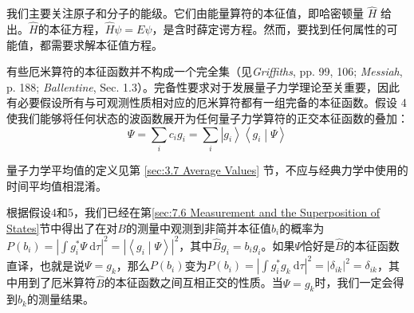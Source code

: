    \begin{center}
    \end{center}

    我们主要关注原子和分子的能级。它们由能量算符的本征值，即哈密顿量 $\hat{H}$ 给出。$\hat{H}$的本征方程，$\hat{H}\psi = E\psi$，是含时薛定谔方程。然而，要找到任何属性的可能值，都需要求解本征值方程。

    \begin{center}
    \end{center}

    有些厄米算符的本征函数并不构成一个完全集（见\textit{Griffiths}, pp. 99, 106; \textit{Messiah}, p. 188; \textit{Ballentine}, Sec. 1.3）。完备性要求对于发展量子力学理论至关重要，因此有必要假设所有与可观测性质相对应的厄米算符都有一组完备的本征函数。假设 4 使我们能够将任何状态的波函数展开为任何量子力学算符的正交本征函数的叠加：
    \begin{equation}
        \Psi = \sum_{i}c_ig_i = \sum_{i}\left| g_i \right\rangle \left\langle g_i \middle| \Psi \right\rangle
        \label{eq:7.95}
    \end{equation}

    \begin{center}
    \end{center}

    量子力学平均值的定义见第 \ref{sec:3.7 Average Values} 节，不应与经典力学中使用的时间平均值相混淆。

    根据假设4和5，我们已经在第\ref{sec:7.6 Measurement and the Superposition of States}节中得出了在对$B$的测量中观测到非简并本征值$b_i$的概率为$P\left(b_i\right) = \left|\int g_i^{\ast}\Psi \: \mathrm{d}\tau\right|^2 = \left|\left\langle g_i \middle| \Psi \right\rangle\right|^2$，其中$\hat{B}g_i = b_ig_i$。如果$\Psi$恰好是$\hat{B}$的本征函数直译，也就是说$\Psi = g_k$，那么$P\left(b_i\right)$变为$P\left(b_i\right) = \left|\int g_i^{\ast}g_k\:\mathrm{d}\tau\right|^2 = \left|\delta_{ik}\right|^2 = \delta_{ik}$，其中用到了厄米算符$\hat{B}$的本征函数之间互相正交的性质。当$\Psi = g_k$时，我们一定会得到$b_k$的测量结果。

